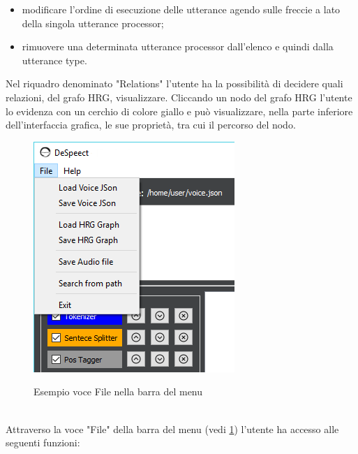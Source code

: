 		\begin{itemize}
			\item{}modificare l'ordine di esecuzione delle utterance agendo sulle freccie a lato della singola utterance processor;
			\item{}rimuovere una determinata utterance processor dall'elenco e quindi dalla utterance type.
		\end{itemize}
		Nel riquadro denominato "Relations" l'utente ha la possibilità di decidere quali relazioni, del grafo HRG, visualizzare. Cliccando un nodo del grafo HRG l'utente lo evidenza con un cerchio di colore giallo e può visualizzare, nella parte inferiore dell'interfaccia grafica, le sue proprietà, tra cui il percorso del nodo.
	\begin{figure}[htp]
	\caption{Esempio voce File nella barra del menu}
	\centering
	\includegraphics[]{../img/menu-file.png}
	\label{fig:menufile}
\end{figure}
	\\ Attraverso la voce "File" della barra del menu (vedi \ref{fig:menufile}) l'utente ha accesso alle seguenti funzioni:
	 	
